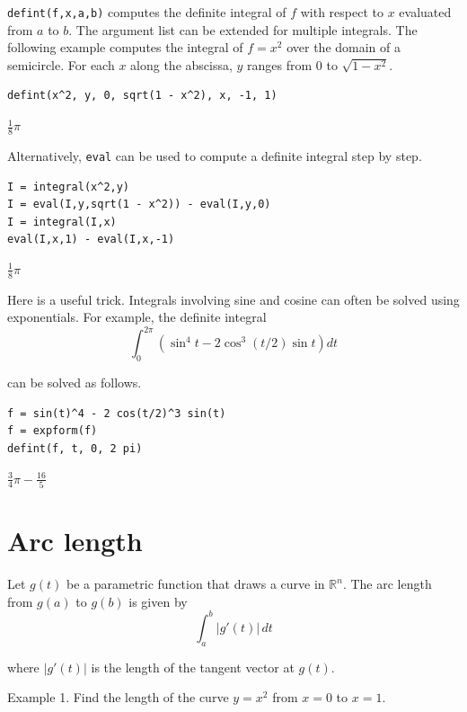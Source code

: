 \documentclass[12pt]{article}
\begin{document}
\bigskip
\verb$defint(f,x,a,b)$
computes the definite integral of $f$ with respect to $x$ evaluated from
$a$ to $b$.
The argument list can be extended for multiple integrals.
The following example computes the integral of $f=x^2$
over the domain of a semicircle.
For each $x$ along the abscissa, $y$ ranges from 0 to $\sqrt{1-x^2}$.

{\color{blue}
\begin{verbatim}
defint(x^2, y, 0, sqrt(1 - x^2), x, -1, 1)
\end{verbatim}
}

$\displaystyle \tfrac{1}{8}\pi$

\bigskip
Alternatively, \verb$eval$ can be used to compute a definite integral step by step.

{\color{blue}
\begin{verbatim}
I = integral(x^2,y)
I = eval(I,y,sqrt(1 - x^2)) - eval(I,y,0)
I = integral(I,x)
eval(I,x,1) - eval(I,x,-1)
\end{verbatim}
}

$\displaystyle \tfrac{1}{8}\pi$

\bigskip
Here is a useful trick.
Integrals involving sine and cosine
can often be solved using exponentials.
For example, the definite integral
\begin{equation*}
\int_0^{2\pi}\left(\sin^4t-2\cos^3(t/2)\sin t\right)dt
\end{equation*}

can be solved as follows.

{\color{blue}
\begin{verbatim}
f = sin(t)^4 - 2 cos(t/2)^3 sin(t)
f = expform(f)
defint(f, t, 0, 2 pi)
\end{verbatim}
}

$\displaystyle \tfrac{3}{4}\pi-\tfrac{16}{5}$

\newpage

\section{Arc length}

Let $g(t)$ be a parametric function that draws a curve in $\mathbb R^n$.
The arc length from $g(a)$ to $g(b)$ is given by
\begin{equation*}
\int_a^b|g'(t)|\,dt
\end{equation*}

where $|g'(t)|$ is the length of the tangent vector at $g(t)$.

\bigskip
Example 1.
Find the length of the curve $y=x^2$ from $x=0$ to $x=1$.
\end{document}
